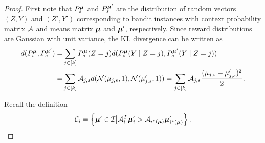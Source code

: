 \begin{proof}
            First note that $P^{\boldsymbol{\mu}}_{s}$ and $P^{\boldsymbol{\mu}'}_{s}$ are the distribution of random vectors $(Z,Y)$ and $(Z',Y')$ corresponding to bandit instances with context probability matrix $\mathcal{A}$ and means matrix $\boldsymbol{\mu}$ and $\boldsymbol{\mu}'$, respectively. Since reward distributions are Gaussian with unit variance, the KL divergence can be written as            
            \begin{align*}
                d(P^{\boldsymbol{\mu}}_{s}, P^{\boldsymbol{\mu}'}_{s}) = &\sum_{j \in [k]} P^{\boldsymbol{\mu}}_{s}(Z = j) d(P^{\boldsymbol{\mu}}_{s} (Y \mid Z = j), P^{\boldsymbol{\mu}'}_{s} (Y \mid Z = j)) \\
                                         =&\sum_{j \in [k]} \mathcal{A}_{j, s} d(\mathcal{N}(\mu_{j,s} , 1), \mathcal{N}(\mu'_{j,s}, 1))= \sum_{j \in [k]} \mathcal{A}_{j,s} \frac{(\mu_{j,s} - \mu'_{j, s})^2}{2}. 
            \end{align*}
            
            Recall the definition 
            $$\mathcal{C}_i = \left\{ \boldsymbol{\mu}' \in \mathcal{I} \big| \mathcal{A}_i^T\boldsymbol{\mu}'_i > \mathcal{A}_{i^*(\boldsymbol{\mu})}\boldsymbol{\mu}'_{i^*(\boldsymbol{\mu})} \right\}.$$
            

\end{proof}
